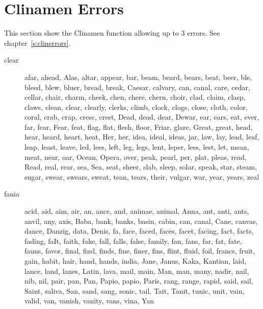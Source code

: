\section{Clinamen Errors}
\label{app:clin3errors}

This section show the Clinamen function allowing up to 3 errors. See chapter~\ref{s:clinerrors}.

\begin{description}
  \item[clear] afar, ahead, Alas, altar, appear, bar, beam, beard, bears, beat, beer, ble, bleed, blew, bluer, bread, break, Caesar, calvary, can, canal, care, cedar, cellar, chair, charm, cheek, chen, chere, chern, choir, clad, claim, clasp, claws, clean, clear, clearly, clerks, climb, clock, clogs, close, cloth, color, coral, crab, crap, cresc, crest, Dead, dead, dear, Dewar, ear, ears, eat, ever, far, fear, Fear, feat, flag, flat, flesh, floor, Friar, glare, Great, great, head, hear, heard, heart, heat, Her, her, idea, ideal, ideas, jar, law, lay, lead, leaf, leap, least, leave, led, lees, left, leg, legs, lent, leper, less, lest, let, mean, meat, near, oar, Ocean, Opera, over, peak, pearl, per, plat, pleas, read, Read, real, rear, sea, Sea, seat, sheer, slab, sleep, solar, speak, star, steam, sugar, swear, swears, sweat, tean, tears, their, vulgar, war, year, years, zeal
  \item[fania] acid, aid, aim, air, an, ance, and, animae, animal, Anna, ant, anti, ants, anvil, any, axis, Baba, bank, banks, basin, cabin, can, canal, Cane, canvas, dance, Danzig, data, Denis, fa, face, faced, faces, facet, facing, fact, facts, fading, faIt, faith, fake, fall, falls, false, family, fan, fans, far, fat, fate, fauns, favor, final, find, finds, fine, finer, fins, flint, fluid, foil, francs, fruit, gain, habit, hair, hand, hands, india, Jane, Janus, Kaka, Kantian, laid, lance, land, lanes, Latin, lava, mail, main, Man, man, many, nadir, nail, nib, nil, pair, pan, Pan, Papio, papio, Paris, rang, range, rapid, said, sail, Saint, saliva, San, sand, sang, sonic, tail, Tait, Tanit, tunic, unit, vain, valid, van, vanish, vanity, vans, vina, Yan

\end{description}
